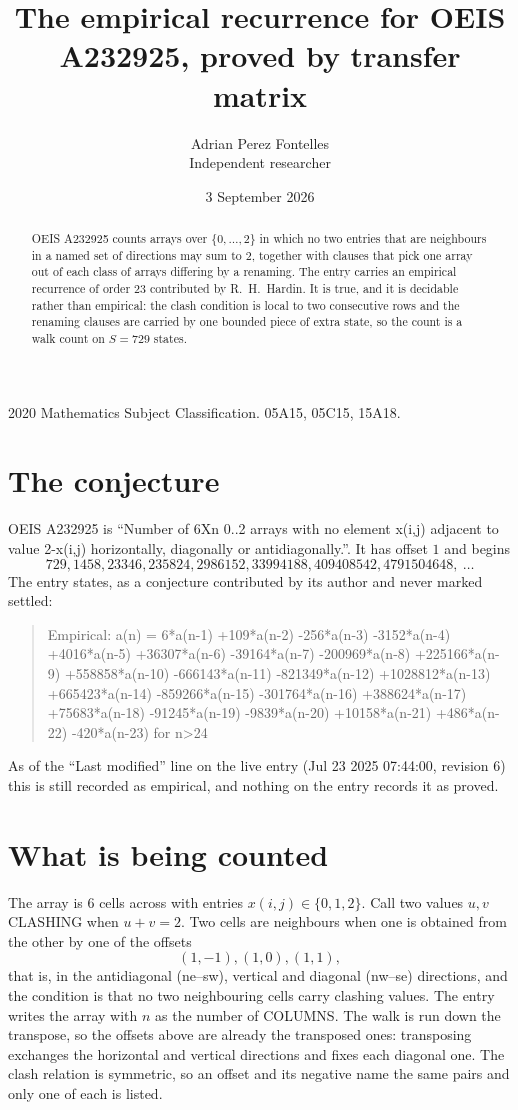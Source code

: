 \documentclass[11pt,a4paper]{article}
\title{The empirical recurrence for OEIS A232925, proved by transfer matrix}
\author{Adrian Perez Fontelles\\ \small Independent researcher}
\date{3 September 2026}
\theoremstyle{plain}
\theoremstyle{definition}
\begin{document}
\maketitle

\begin{abstract}
OEIS A232925 counts arrays over $\{0,\dots,2\}$ in which no two entries that are neighbours in
a named set of directions may sum to $2$, together with clauses that pick one array out of
each class of arrays differing by a renaming. The entry carries an empirical recurrence of
order $23$ contributed by R.~H.~Hardin. It is true, and it is decidable rather than
empirical: the clash condition is local to two consecutive rows and the renaming clauses are
carried by one bounded piece of extra state, so the count is a walk count on $S=729$ states.
\end{abstract}

\noindent\small 2020 Mathematics Subject Classification. 05A15, 05C15, 15A18.\normalsize

\section{The conjecture}

OEIS A232925 is ``Number of 6Xn 0..2 arrays with no element x(i,j) adjacent to value 2-x(i,j) horizontally, diagonally or antidiagonally.''. It has offset $1$ and begins
\[
729, 1458, 23346, 235824, 2986152, 33994188, 409408542, 4791504648,\ \dots
\]
The entry states, as a conjecture contributed by its author and never marked settled:
\begin{quote}
Empirical: a(n) = 6*a(n-1) +109*a(n-2) -256*a(n-3) -3152*a(n-4) +4016*a(n-5) +36307*a(n-6) -39164*a(n-7) -200969*a(n-8) +225166*a(n-9) +558858*a(n-10) -666143*a(n-11) -821349*a(n-12) +1028812*a(n-13) +665423*a(n-14) -859266*a(n-15) -301764*a(n-16) +388624*a(n-17) +75683*a(n-18) -91245*a(n-19) -9839*a(n-20) +10158*a(n-21) +486*a(n-22) -420*a(n-23) for n>24
\end{quote}
As of the ``Last modified'' line on the live entry (Jul 23 2025 07:44:00, revision 6) this is still
recorded as empirical, and nothing on the entry records it as proved.

\section{What is being counted}

The array is $6$ cells across with entries $x(i,j)\in\{0,1,2\}$. Call two values $u,v$ CLASHING
when $u+v=2$. Two cells are neighbours when one is obtained from the other by one of
the offsets
\[
(1,-1), (1,0), (1,1),
\]
that is, in the antidiagonal (ne--sw), vertical and diagonal (nw--se) directions, and the condition is that no two neighbouring cells carry
clashing values. The entry writes the array with $n$ as the number of COLUMNS. The walk is run down the transpose, so the offsets above are already the transposed ones: transposing exchanges the horizontal and vertical directions and fixes each diagonal one. The clash relation is symmetric, so an offset and its negative name the
same pairs and only one of each is listed.
\end{document}
